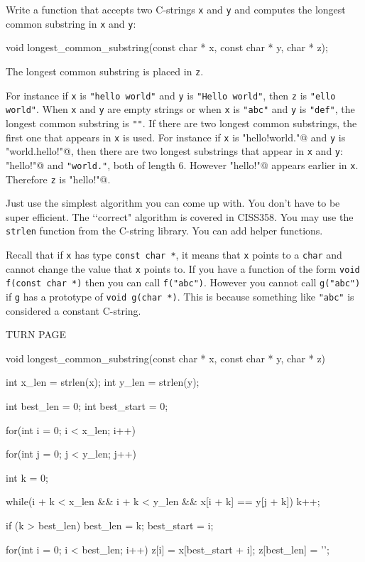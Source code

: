 

\nextq
Write a function that accepts two C-strings \verb!x! and \verb!y! and
computes the longest common substring in \verb!x! and \verb!y!:
\begin{console}
void longest_common_substring(const char * x, const char * y, char * z);
\end{console}
The longest common substring is placed in \verb!z!.

For instance if \verb!x! is \verb!"hello world"! and \verb!y! is
\verb!"Hello world"!, then \verb!z! is \verb!"ello world"!.
When \verb!x! and \verb!y! are empty strings
or when \verb!x! is \verb!"abc"! and \verb!y! is \verb!"def"!, the longest
common substring is \verb!""!.
If there are two longest common substrings, the first one that appears
in \verb!x! is used.
For instance if \verb!x! is \verb@"hello!world."@ and
\verb!y! is \verb@"world.hello!"@, then there are two longest substrings
that appear in \verb!x! and \verb!y!: \verb@"hello!"@ and \verb!"world."!,
both of length 6. However \verb@"hello!"@ appears earlier in \verb!x!.
Therefore \verb!z! is \verb@"hello!"@.

Just use the simplest algorithm you can come up with.
You don't have to be super efficient.
The \lq\lq correct" algorithm is covered in CISS358.
You may use the \verb!strlen! function from the C-string library.
You can add helper functions.

Recall that if \verb!x! has type \verb!const char *!,
it means that \verb!x! points to a \verb!char! and cannot change
the value that \verb!x! points to.
If you have a function of the form
\verb!void f(const char *)!
then you can call \verb!f("abc")!.
However you cannot call \verb!g("abc")! if \verb!g! has a prototype
of \verb!void g(char *)!.
This is because something like \verb!"abc"! is considered a
constant C-string.

TURN PAGE

\newpage
\ANSWER
\begin{answercode}
void longest_common_substring(const char * x, const char * y, char * z)
{
  int x_len = strlen(x);
  int y_len = strlen(y);
  
  int best_len = 0;
  int best_start = 0;
  
  for(int i = 0; i < x_len; i++)
  {
      for(int j = 0; j < y_len; j++)
      {
          int k = 0;
          
          while(i + k < x_len &&
                i + k < y_len &&
                x[i + k] == y[j + k])
          {
              k++;
          }
          
          if (k > best_len)
          {
              best_len = k;
              best_start = i;
          }
      }
  }
  for(int i = 0; i < best_len; i++)
      z[i] = x[best_start + i];
  z[best_len] = '\0';
}
\end{answercode}

